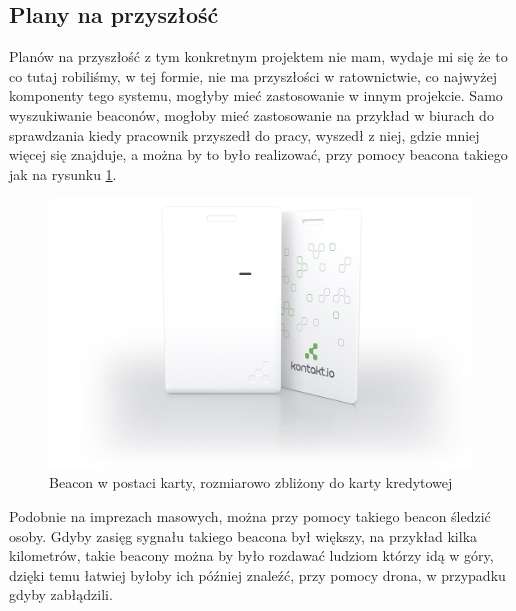 \subsection{Plany na przyszłość}

Planów na przyszłość z tym konkretnym projektem nie mam, wydaje mi się że to co tutaj robiliśmy, w tej formie, nie ma przyszłości w ratownictwie, co najwyżej komponenty tego systemu, mogłyby mieć zastosowanie w innym projekcie. Samo wyszukiwanie beaconów, mogłoby mieć zastosowanie na przykład w biurach do sprawdzania kiedy pracownik przyszedł do pracy, wyszedł z niej, gdzie mniej więcej się znajduje, a można by to było realizować, przy pomocy beacona takiego jak na rysunku \ref{fig:beaconcard}.

\begin{figure}[!th]
    \centering
    \includegraphics[width=15cm]{zalaczniki/obrazy/beacon_card.png}
    \caption{Beacon w postaci karty, rozmiarowo zbliżony do karty kredytowej}
    \label{fig:beaconcard}
\end{figure}

Podobnie na imprezach masowych, można przy pomocy takiego beacon śledzić osoby. Gdyby zasięg sygnału takiego beacona był większy, na przykład kilka kilometrów, takie beacony można by było rozdawać ludziom którzy idą w góry, dzięki temu łatwiej byłoby ich później znaleźć, przy pomocy drona, w przypadku gdyby zabłądzili.
